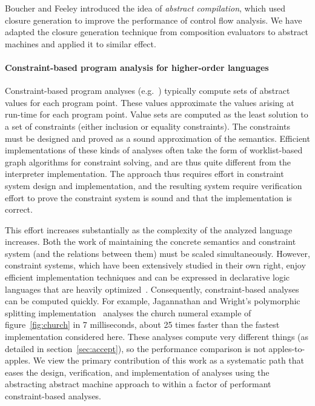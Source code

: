\documentclass[preprint,onecolumn,9pt]{sigplanconf} %
\begin{document}
Boucher and Feeley \cite{dvanhorn:Boucher1996Abstract} introduced the
idea of \emph{abstract compilation}, which used closure generation
\cite{dvanhorn:Feeley1987Using} to improve the performance of control
flow analysis.  We have adapted the closure generation technique from
composition evaluators to abstract machines and applied it to similar
effect.

\paragraph{Constraint-based program analysis for higher-order languages}

Constraint-based program analyses
(e.g.~\cite{dvanhorn:nielson-nielson-popl97,dvanhorn:wright-jagannathan-toplas98,dvanhorn:Meunier2006Modular})
typically compute sets of abstract values for each program point.
These values approximate the values arising at run-time for each
program point.  Value sets are computed as the least solution to a set
of constraints (either inclusion or equality constraints).  The
constraints must be designed and proved as a sound approximation of
the semantics.  Efficient implementations of these kinds of analyses
often take the form of worklist-based graph algorithms for constraint
solving, and are thus quite different from the interpreter
implementation.  The approach thus requires effort in constraint
system design and implementation, and the resulting system require
verification effort to prove the constraint system is sound and that
the implementation is correct.

This effort increases substantially as the complexity of the analyzed
language increases.  Both the work of maintaining the concrete
semantics and constraint system (and the relations between them) must
be scaled simultaneously.  However, constraint systems, which have
been extensively studied in their own right, enjoy efficient
implementation techniques and can be expressed in declarative logic
languages that are heavily
optimized~\cite{dvanhorn:bravenboer-smaragdakis-oopsla09}.
Consequently, constraint-based analyses can be computed quickly.  For
example, Jagannathan and Wright's polymorphic splitting
implementation~\cite{dvanhorn:wright-jagannathan-toplas98} analyses
the church numeral example of figure~\ref{fig:church} in 7
milliseconds, about 25 times faster than the fastest implementation
considered here.  These analyses compute very different things (as
detailed in section~\ref{sec:accept}), so the performance comparison
is not apples-to-apples.  We view the primary contribution of this
work as a systematic path that eases the design, verification, and
implementation of analyses using the abstracting abstract machine
approach to within a factor of performant constraint-based analyses.
\end{document}
